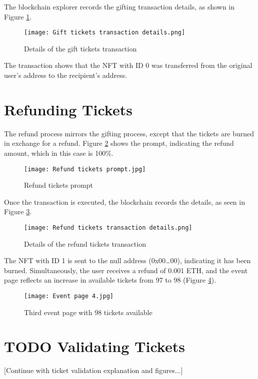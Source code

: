 The blockchain explorer records the gifting transaction details, as shown in
Figure \ref{fig:gift_tickets_transaction_details}.

\begin{figure}[H]
    \texttt{[image: Gift tickets transaction details.png]}
    \centering
    \caption{Details of the gift tickets transaction}
    \label{fig:gift_tickets_transaction_details}
\end{figure}

The transaction shows that the NFT with ID 0 was transferred from the original
user's address to the recipient's address.

\section{Refunding Tickets}
\label{sec:refund_tickets}

The refund process mirrors the gifting process, except that the tickets are
burned in exchange for a refund. Figure \ref{fig:refund_tickets_prompt} shows
the prompt, indicating the refund amount, which in this case is 100\%.

\begin{figure}[H]
    \texttt{[image: Refund tickets prompt.jpg]}
    \centering
    \caption{Refund tickets prompt}
    \label{fig:refund_tickets_prompt}
\end{figure}

Once the transaction is executed, the blockchain records the details, as seen
in Figure \ref{fig:refund_tickets_transaction_details}.

\begin{figure}[H]
    \texttt{[image: Refund tickets transaction details.png]}
    \centering
    \caption{Details of the refund tickets transaction}
    \label{fig:refund_tickets_transaction_details}
\end{figure}

The NFT with ID 1 is sent to the null address (0x00\dots00), indicating it has
been burned. Simultaneously, the user receives a refund of 0.001 ETH, and the
event page reflects an increase in available tickets from 97 to 98 (Figure
\ref{fig:refund_tickets_event}).

\begin{figure}[H]
    \texttt{[image: Event page 4.jpg]}
    \centering
    \caption{Third event page with 98 tickets available}
    \label{fig:refund_tickets_event}
\end{figure}

\section{TODO Validating Tickets}
\label{sec:validate_tickets}

[Continue with ticket validation explanation and figures...]
